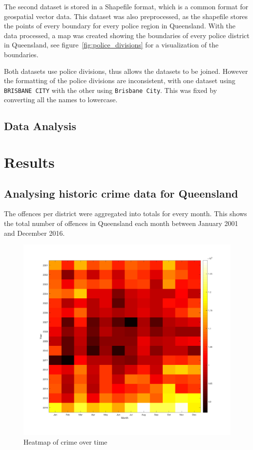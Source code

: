 \documentclass[]{article}
\begin{document}
The second dataset is stored in a Shapefile format, which is a common format for geospatial vector data.
This dataset was also preprocessed, as the shapefile stores the points of every boundary for every police region in Queensland.
With the data processed, a map was created showing the boundaries of every police district in Queensland, see  figure~\ref{fig:police_divisions} for a visualization of the boundaries.

Both datasets use police divisions, thus allows the datasets to be joined.
However the formatting of the police divisions are inconsistent,
with one dataset using \verb|BRISBANE CITY| with the other using \verb|Brisbane City|. 
This was fixed by converting all the names to lowercase.

\subsection{Data Analysis}


\section{Results}

\subsection{Analysing historic crime data for Queensland}

The offences per district were aggregated into totals for every month.
This shows the total number of offences in Queensland each month between January 2001 and December 2016.

\begin{figure}[H]
    \caption{Heatmap of crime over time}
    \centering
    \includegraphics[width=\linewidth]{../images/crime_time_heatmap}
\end{figure}
\end{document}
